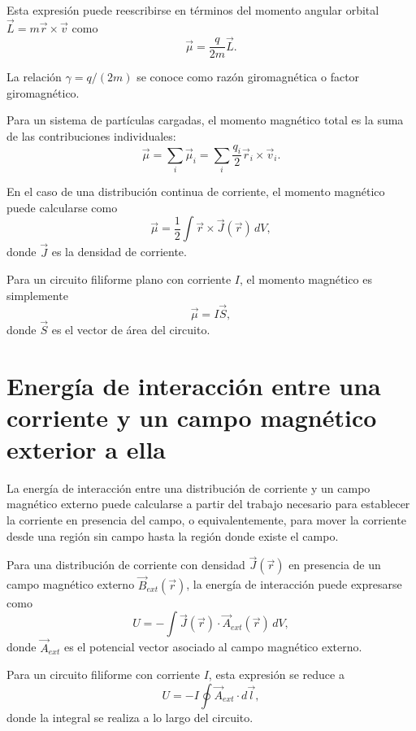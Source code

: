\documentclass[12pt,a4paper]{book}
\begin{document}
Esta expresión puede reescribirse en términos del momento angular orbital $\vec{L} = m\vec{r} \times \vec{v}$ como
\begin{equation}
\vec{\mu} = \frac{q}{2m} \vec{L}.
\end{equation}

La relación $\gamma = q/(2m)$ se conoce como razón giromagnética o factor giromagnético.

Para un sistema de partículas cargadas, el momento magnético total es la suma de las contribuciones individuales:
\begin{equation}
\vec{\mu} = \sum_i \vec{\mu}_i = \sum_i \frac{q_i}{2} \vec{r}_i \times \vec{v}_i.
\end{equation}

En el caso de una distribución continua de corriente, el momento magnético puede calcularse como
\begin{equation}
\vec{\mu} = \frac{1}{2} \int \vec{r} \times \vec{J}(\vec{r}) \, dV,
\end{equation}
donde $\vec{J}$ es la densidad de corriente.

Para un circuito filiforme plano con corriente $I$, el momento magnético es simplemente
\begin{equation}
\vec{\mu} = I \vec{S},
\end{equation}
donde $\vec{S}$ es el vector de área del circuito.

\section{Energía de interacción entre una corriente y un campo magnético exterior a ella}

La energía de interacción entre una distribución de corriente y un campo magnético externo puede calcularse a partir del trabajo necesario para establecer la corriente en presencia del campo, o equivalentemente, para mover la corriente desde una región sin campo hasta la región donde existe el campo.

Para una distribución de corriente con densidad $\vec{J}(\vec{r})$ en presencia de un campo magnético externo $\vec{B}_{ext}(\vec{r})$, la energía de interacción puede expresarse como
\begin{equation}
U = -\int \vec{J}(\vec{r}) \cdot \vec{A}_{ext}(\vec{r}) \, dV,
\end{equation}
donde $\vec{A}_{ext}$ es el potencial vector asociado al campo magnético externo.

Para un circuito filiforme con corriente $I$, esta expresión se reduce a
\begin{equation}
U = -I \oint \vec{A}_{ext} \cdot d\vec{l},
\end{equation}
donde la integral se realiza a lo largo del circuito.
\end{document}
